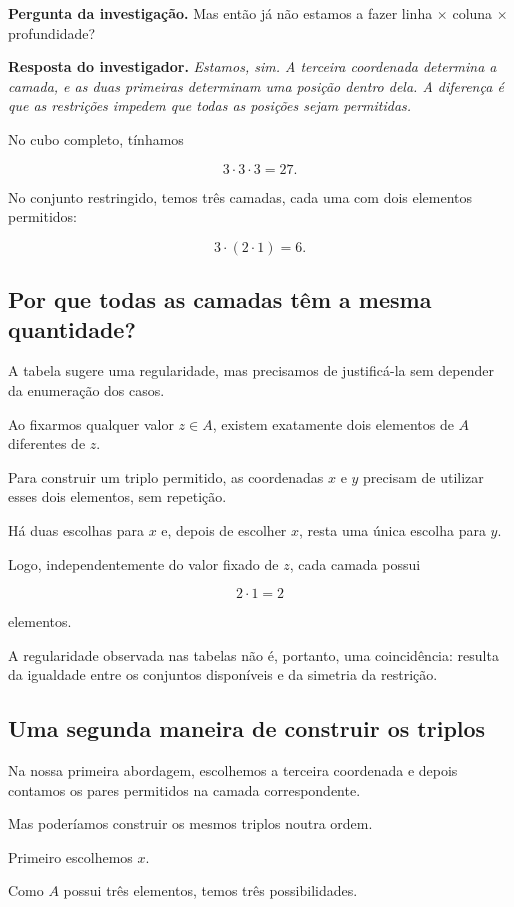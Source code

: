 \documentclass[11pt,a4paper,oneside]{book}
\newcommand{\Pergunta}[1]{\begin{perguntabox}\textbf{Pergunta da investigação.} #1\end{perguntabox}}
\newcommand{\Resposta}[1]{\textcolor{verdeescuro}{\textbf{Resposta do investigador.}} \emph{#1}\par}
\begin{document}
\Pergunta{Mas então já não estamos a fazer linha
$\times$ coluna $\times$ profundidade?}

\Resposta{Estamos, sim. A terceira coordenada
determina a camada, e as duas primeiras determinam
uma posição dentro dela. A diferença é que as
restrições impedem que todas as posições sejam
permitidas.}

No cubo completo, tínhamos

\[
3\cdot3\cdot3=27.
\]

No conjunto restringido, temos três camadas, cada uma
com dois elementos permitidos:

\[
3\cdot(2\cdot1)=6.
\]

\subsection*{Por que todas as camadas têm a mesma quantidade?}

A tabela sugere uma regularidade, mas precisamos de
justificá-la sem depender da enumeração dos casos.

Ao fixarmos qualquer valor $z\in A$, existem
exatamente dois elementos de $A$ diferentes de $z$.

Para construir um triplo permitido, as coordenadas
$x$ e $y$ precisam de utilizar esses dois elementos,
sem repetição.

Há duas escolhas para $x$ e, depois de escolher $x$,
resta uma única escolha para $y$.

Logo, independentemente do valor fixado de $z$,
cada camada possui

\[
2\cdot1=2
\]

elementos.

A regularidade observada nas tabelas não é, portanto,
uma coincidência: resulta da igualdade entre os
conjuntos disponíveis e da simetria da restrição.

\subsection*{Uma segunda maneira de construir os triplos}

Na nossa primeira abordagem, escolhemos a terceira
coordenada e depois contamos os pares permitidos
na camada correspondente.

Mas poderíamos construir os mesmos triplos noutra
ordem.

Primeiro escolhemos $x$.

Como $A$ possui três elementos, temos três
possibilidades.
\end{document}
